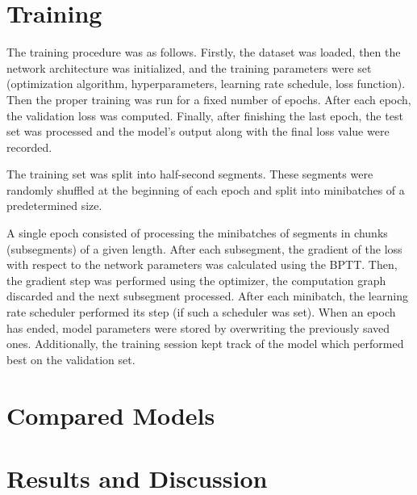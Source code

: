 \section{Training}
\label{sec:diode_clipper_training}

The training procedure was as follows. Firstly, the dataset was loaded, then the network architecture was initialized, and the training parameters were set (optimization algorithm, hyperparameters, learning rate schedule, loss function). Then the proper training was run for a fixed number of epochs. After each epoch, the validation loss was computed. Finally, after finishing the last epoch, the test set was processed and the model's output along with the final loss value were recorded.

The training set was split into half-second segments. These segments were randomly shuffled at the beginning of each epoch and split into minibatches of a predetermined size.

A single epoch consisted of processing the minibatches of segments in chunks (subsegments) of a given length. After each subsegment, the gradient of the loss with respect to the network parameters was calculated using the \ac{BPTT}. Then, the gradient step was performed using the optimizer, the computation graph discarded and the next subsegment processed. After each minibatch, the learning rate scheduler performed its step (if such a scheduler was set). When an epoch has ended, model parameters were stored by overwriting the previously saved ones. Additionally, the training session kept track of the model which performed best on the validation set.

\section{Compared Models}
\label{sec:diode_clipper_models}

\section{Results and Discussion}
\label{sec:diode_clipper_results}


